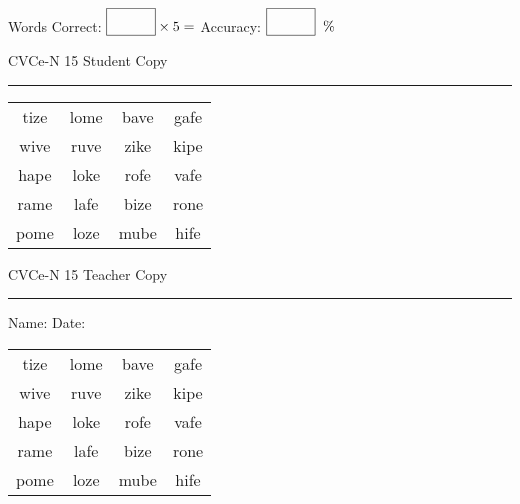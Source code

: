 \documentclass{memoir}
\begin{document}
\small

Words Correct: $\fbox{\phantom{\huge 100}} \times 5 = $ Accuracy: $\fbox{\phantom{\huge 100}}\;\; \%$ 

\vfill

\newpage


\footnotesize \noindent
CVCe-N 15 \hfill Student Copy
\smallskip
\hrule

\Large

\setlength{\tabcolsep}{14pt}
\def\arraystretch{2}

{\selectfont


\begin{vplace}[0.5]
\begin{center}
\begin{tabular}{cccc}
tize & lome & bave & gafe \\
wive & ruve & zike & kipe \\
hape & loke & rofe & vafe \\
rame & lafe & bize & rone \\
pome & loze & mube & hife \\
\end{tabular}
\end{center}
\end{vplace}

}

\newpage

\footnotesize \noindent
CVCe-N 15 \hfill Teacher Copy
\smallskip
\hrule

\small

\vfill

\noindent
Name: \underline{\hspace{1.75in}} \hfill Date: \underline{\hspace{1in}}

\Large

{\selectfont


\begin{vplace}[0.5]
\begin{center}
\begin{tabular}{cccc}
tize & lome & bave & gafe \\
wive & ruve & zike & kipe \\
hape & loke & rofe & vafe \\
rame & lafe & bize & rone \\
pome & loze & mube & hife \\
\end{tabular}
\end{center}
\end{vplace}



}
\end{document}
